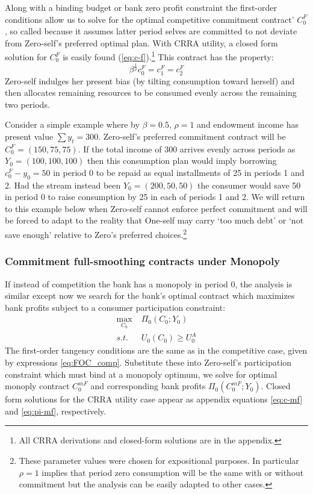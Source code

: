 \documentclass[11pt,english]{article}
\theoremstyle{plain}
\theoremstyle{definition}
\begin{document}
Along with a binding budget or bank zero profit constraint the first-order conditions
allow us to solve for the optimal competitive  commitment
contract' $C_{0}^{F}$, so called because it assumes latter period selves are committed to not deviate from Zero-self's preferred optimal plan. With CRRA utility, a closed form solution
for $C_{0}^{F}$ is easily found (\ref{eq:c-f}).\footnote{All CRRA derivations and closed-form solutions are in the appendix.}
This contract has the property: 
\begin{equation}
\beta^{\frac{1}{\rho}}c_{0}^{F}=c_{1}^{F}=c_{2}^{F}
\end{equation}
Zero-self  indulges her present bias (by tilting consumption
toward herself) and then allocates remaining resources to be consumed evenly across
the remaining two periods. 

Consider a simple example where by $\beta=0.5$, $\rho=1$ and endowment
income has present value $\sum y_{t}=300$. Zero-self's preferred commitment contract will be $C_{0}^{F}=(150,75,75)$.
If the total income of $300$ arrives evenly across
periods as $Y_{0}=(100,100,100)$ then this consumption plan would
imply borrowing $c_{0}^{F}-y_{0}=50$ in period 0 to be repaid as
equal installments of 25 in  periods 1 and 2. Had the stream instead
been $Y_{0}=(200,50,50)$ the consumer would save 50
in period 0 to raise consumption by 25 in each of periods 1 and 2.
We will return to this example  below when  Zero-self cannot enforce perfect commitment and will be forced to adapt to the reality that One-self may  carry `too much debt' or `not save enough' relative to Zero's preferred choices.\footnote{These parameter values were chosen for expositional purposes. In particular
$\rho=1$ implies that period zero consumption will be the same with
or without commitment but the analysis can be easily adapted to other
cases.}


\subsubsection{Commitment full-smoothing contracts under Monopoly}

\label{sec:own}

If instead of competition the bank has a monopoly in
period 0, the analysis is similar except now we search for the bank's optimal contract which maximizes bank profits subject
to a consumer participation constraint:
\begin{align}
\max_{C_{0}} & \;\Pi_{0}\left(C_{0};Y_{0}\right)\label{eq:monop-obj}\\
s.t. & \;U_{0}\left(C_{0}\right)\geq U_{0}^{A}\label{eq:CPC0}
\end{align}
The first-order tangency conditions are the same as in the competitive
case, given by expressions \ref{eq:FOC_comp}. Substitute these into Zero-self's participation constraint which must bind at a monopoly
optimum, we solve for optimal monoply contract $C_{0}^{mF}$
and corresponding bank profits $\Pi_{0}\left(C_{0}^{mF};Y_{0}\right)$.
Closed form solutions for the CRRA utility case appear as appendix
equations \ref{eq:c-mf} and \ref{eq:pi-mf}, respectively. 
\end{document}
